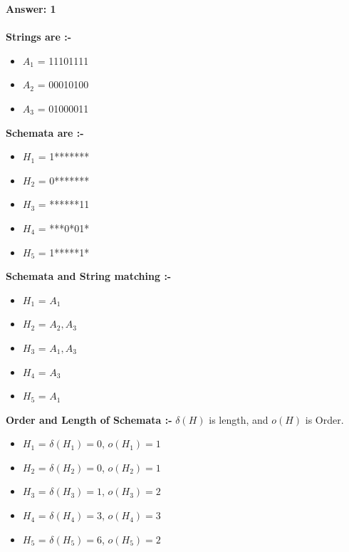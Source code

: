 \documentclass[12pt,letterpaper]{article}
\newcommand \order{o}
\begin{document}
\textbf{\Large Answer: 1}\\\\
\textbf{Strings are :-}
\begin{itemize}
    \item $A_1$ = 11101111
    \item $A_2$ = 00010100
    \item $A_3$ = 01000011
\end{itemize}

\textbf{Schemata are :-}
\begin{itemize}
    \item $H_1$ = 1*******
    \item $H_2$ = 0*******
    \item $H_3$ = ******11
    \item $H_4$ = ***0*01*
    \item $H_5$ = 1*****1*
\end{itemize}
\textbf{\large Schemata and String matching :-}
\begin{itemize}
    \item $H_1$ = $A_1$
    \item $H_2$ = $A_2, A_3$
    \item $H_3$ = $A_1, A_3$
    \item $H_4$ = $A_3$
    \item $H_5$ = $A_1$
\end{itemize}

\textbf{\large Order and Length of Schemata :-}
$\delta(H)$ is length, and $\order(H)$ is Order.
\begin{itemize}
    \item $H_1$ = $\delta(H_1) = 0$, $\order(H_1) = 1$
    \item $H_2$ = $\delta(H_2) = 0$, $\order(H_2) = 1$
    \item $H_3$ = $\delta(H_3) = 1$, $\order(H_3) = 2$
    \item $H_4$ = $\delta(H_4) = 3$, $\order(H_4) = 3$
    \item $H_5$ = $\delta(H_5) = 6$, $\order(H_5) = 2$\\
\end{itemize}
\end{document}
